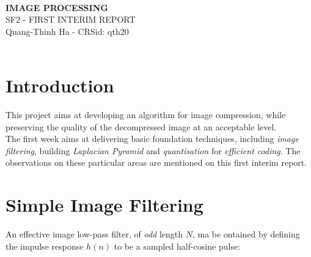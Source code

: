 \documentclass[a4paper, 11pt]{article}
\begin{document}
\Large
\begin{center}
\hrulefill \\
\textbf{IMAGE PROCESSING} \\
SF2 - FIRST INTERIM REPORT \\
\vspace{0.2cm}
\normalsize 
Quang-Thinh Ha - CRSid: qth20 \\
\hrulefill \\
\end{center}

\normalsize

\section{Introduction}

This project aims at developing an algorithm for image compression, while preserving the quality of the decompressed image at an acceptable level. \\
\noindent
The first week aims at delivering basic foundation techniques, including \textit{image filtering}, building \textit{Laplacian Pyramid} and \textit{quantisation} for \textit{efficient coding}. The observations on these particular areas are mentioned on this first interim report. 

\section{Simple Image Filtering}
An effective image low-pass filter, of \textit{odd} length $\mathit{N}$, ma be ontained by defining the impulse response $\mathit{h(n)}$ to be a sampled half-cosine pulse:
\end{document}
